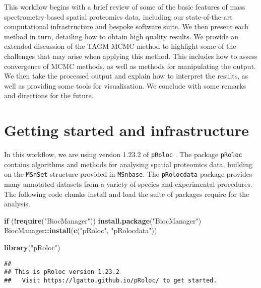 \documentclass[9pt,a4paper,]{extarticle}
\newenvironment{Shaded}{\begin{snugshade}}{\end{snugshade}}
\newcommand{\ControlFlowTok}[1]{\textcolor[rgb]{0.13,0.29,0.53}{\textbf{#1}}}
\newcommand{\KeywordTok}[1]{\textcolor[rgb]{0.13,0.29,0.53}{\textbf{#1}}}
\newcommand{\NormalTok}[1]{#1}
\newcommand{\OperatorTok}[1]{\textcolor[rgb]{0.81,0.36,0.00}{\textbf{#1}}}
\newcommand{\StringTok}[1]{\textcolor[rgb]{0.31,0.60,0.02}{#1}}
\begin{document}
This workflow begins with a brief review of some of the basic features
of mass spectrometry-based spatial proteomics data, including our
state-of-the-art computational infrastructure and bespoke software
suite. We then present each method in turn, detailing how to obtain
high quality results. We provide an extended discussion of the
TAGM MCMC method to highlight some of the challenges that may arise
when applying this method. This includes how to assess convergence of
MCMC methods, as well as methods for manipulating the output. We then
take the processed output and explain how to interpret the results, as
well as providing some tools for visualisation. We conclude with some
remarks and directions for the future.

\hypertarget{getting-started-and-infrastructure}{%
\section{Getting started and infrastructure}\label{getting-started-and-infrastructure}}

In this workflow, we are using version 1.23.2 of \texttt{pRoloc}
\citep{pRoloc:2014}. The package \texttt{pRoloc} contains algorithms and methods
for analysing spatial proteomics data, building on the \texttt{MSnSet}
structure provided in \texttt{MSnbase}. The \texttt{pRolocdata} package provides
many annotated datasets from a variety of species and experimental
procedures. The following code chunks install and load the suite of
packages require for the analysis.

\begin{Shaded}
\begin{Highlighting}[]
\ControlFlowTok{if}\NormalTok{ (}\OperatorTok{!}\KeywordTok{require}\NormalTok{(}\StringTok{"BiocManager"}\NormalTok{))}
    \KeywordTok{install.package}\NormalTok{(}\StringTok{"BiocManager"}\NormalTok{)}
\NormalTok{BiocManager}\OperatorTok{::}\KeywordTok{install}\NormalTok{(}\KeywordTok{c}\NormalTok{(}\StringTok{"pRoloc"}\NormalTok{, }\StringTok{"pRolocdata"}\NormalTok{))}
\end{Highlighting}
\end{Shaded}

\begin{Shaded}
\begin{Highlighting}[]
\KeywordTok{library}\NormalTok{(}\StringTok{"pRoloc"}\NormalTok{)}
\end{Highlighting}
\end{Shaded}

\begin{verbatim}
## 
## This is pRoloc version 1.23.2 
##   Visit https://lgatto.github.io/pRoloc/ to get started.
\end{verbatim}
\end{document}
